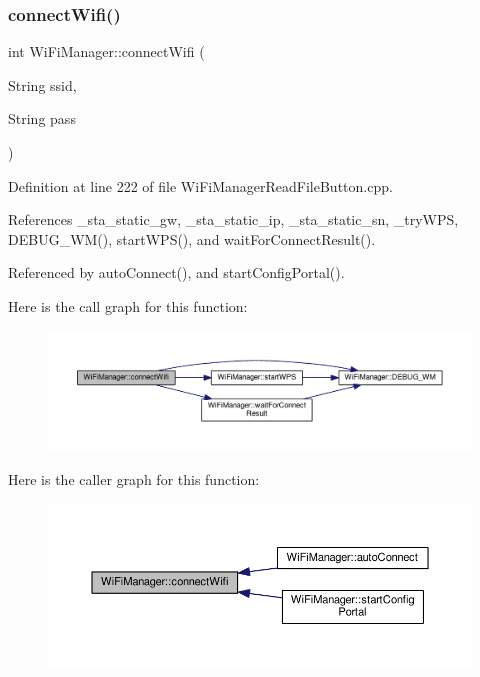 \subsubsection{\texorpdfstring{connect\+Wifi()}{connectWifi()}}
{\footnotesize\ttfamily int Wi\+Fi\+Manager\+::connect\+Wifi (\begin{DoxyParamCaption}\item[{String}]{ssid,  }\item[{String}]{pass }\end{DoxyParamCaption})\hspace{0.3cm}{\ttfamily [private]}}



Definition at line 222 of file Wi\+Fi\+Manager\+Read\+File\+Button.\+cpp.



References \+\_\+sta\+\_\+static\+\_\+gw, \+\_\+sta\+\_\+static\+\_\+ip, \+\_\+sta\+\_\+static\+\_\+sn, \+\_\+try\+W\+PS, D\+E\+B\+U\+G\+\_\+\+W\+M(), start\+W\+P\+S(), and wait\+For\+Connect\+Result().



Referenced by auto\+Connect(), and start\+Config\+Portal().

Here is the call graph for this function\+:
\nopagebreak
\begin{figure}[H]
\begin{center}
\leavevmode
\includegraphics[width=350pt]{d4/dc8/class_wi_fi_manager_ae0ae27b5543b47585728c084c3bbdca7_cgraph}
\end{center}
\end{figure}
Here is the caller graph for this function\+:
\nopagebreak
\begin{figure}[H]
\begin{center}
\leavevmode
\includegraphics[width=350pt]{d4/dc8/class_wi_fi_manager_ae0ae27b5543b47585728c084c3bbdca7_icgraph}
\end{center}
\end{figure}
\mbox{\label{class_wi_fi_manager_a89a3f33997aa662ad223d6c150c1eede}} 

